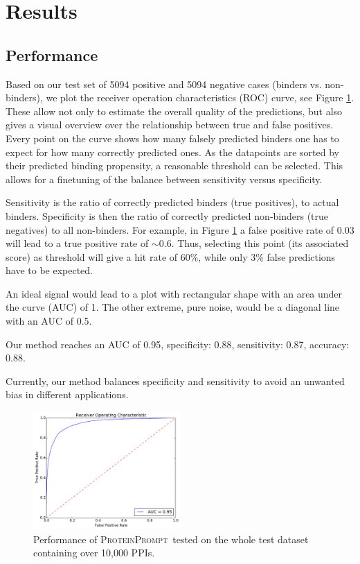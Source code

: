 \documentclass[3p,times,twocolumn]{elsarticle}
\newcommand{\tool}{\textsc{ProteinPrompt}}
\begin{document}

\section{Results}


\subsection{Performance}
\label{performance}

Based on our test set of 5094 positive and 5094 negative cases
(binders vs. non-binders), we plot the receiver operation
characteristics (ROC) curve, see Figure \ref{fig:roc}.
These allow not only to estimate the overall quality of the predictions, but also
gives a visual overview over the relationship between true and false
positives.
Every point on the curve shows how many falsely predicted binders one has to expect for how many correctly predicted ones.
As the datapoints are sorted by their predicted binding propensity, a reasonable threshold can be selected.
This allows for a finetuning of the balance between sensitivity versus specificity.

Sensitivity is the ratio of correctly predicted binders (true positives), to actual binders.
  Specificity is then the ratio of correctly predicted non-binders (true negatives) to all non-binders.
  For example, in Figure \ref{fig:roc} a false positive rate of 0.03 will lead to a true positive rate of $\sim$0.6.
  Thus, selecting this point (its associated score) as threshold will give a hit rate of 60\%, while only 3\% false predictions have to be expected.


An ideal signal would lead to a plot with rectangular shape
with an area under the curve (AUC) of 1. The other extreme, pure noise, would be a diagonal
line with an AUC of 0.5.

Our method reaches an AUC of 0.95,
specificity: 0.88,
sensitivity: 0.87,
accuracy: 0.88.

Currently, our method balances specificity and sensitivity to avoid an
unwanted bias in different applications.

\begin{figure}[t]
\includegraphics[width=0.5\textwidth]{img/meta_final_roc.pdf}
\caption{Performance of \tool\  tested on the whole test dataset
  containing over 10,000 PPIs.}
\label{fig:roc}
\end{figure} 
\end{document}
